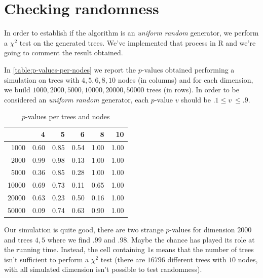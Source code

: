 \section{Checking randomness}

In order to establish if the algorithm is an \emph{uniform random}
generator, we perform a $\chi^2$ test on the generated trees. We've
implemented that process in R and we're going to comment the result
obtained.

In \autoref{table:p-values-per-nodes} we report the $p$-values
obtained performing a simulation on trees with $4,5,6,8,10$ nodes
(in columns) and for each dimension, we build $1000, 2000, 5000,
10000, 20000, 50000$ trees (in rows). In order to be considered an
\emph{uniform random} generator, each $p$-value $v$ should be $.1
\leq v\ \leq .9$.
\begin{table}[ht]
  \begin{center}
    \begin{tabular}{rrrrrr}
      \hline
      & 4 & 5 & 6 & 8 & 10 \\ 
      \hline
      1000 & 0.60 & 0.85 & 0.54 & 1.00 & 1.00 \\ 
      2000 & 0.99 & 0.98 & 0.13 & 1.00 & 1.00 \\ 
      5000 & 0.36 & 0.85 & 0.28 & 1.00 & 1.00 \\ 
      10000 & 0.69 & 0.73 & 0.11 & 0.65 & 1.00 \\ 
      20000 & 0.63 & 0.23 & 0.50 & 0.16 & 1.00 \\ 
      50000 & 0.09 & 0.74 & 0.63 & 0.90 & 1.00 \\ 
      \hline
    \end{tabular}
    \caption{$p$-values per trees and nodes}
    \label{table:p-values-per-nodes}
  \end{center}
\end{table}
Our simulation is quite good, there are two strange $p$-values for
dimension $2000$ and trees $4,5$ where we find $.99$ and $.98$. Maybe
the chance has played its role at the running time. Instead, the cell
containing $1$s means that the number of trees isn't sufficient to
perform a $\chi^2$ test (there are $16796$ different trees with $10$
nodes, with all simulated dimension isn't possible to test
randomness).


